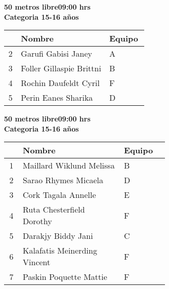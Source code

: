 \begin{minipage}{0.95\linewidth}\vspace{0.5cm} 
\begin{flushleft}
\textbf{
\hspace{-0.15cm}50 metros libre\hspace{1.5cm}09:00 hrs \\Categoria 15-16 años}\vspace{-0.2cm} 
\end{flushleft}
\begin{tabular}{cp{0.63\linewidth}l}
\hline
& \textbf{Nombre} & \textbf{Equipo} \\ \hline
2 & Garufi Gabisi Janey & A \\ 
3 & Foller Gillaspie Brittni & B \\ 
4 & Rochin Daufeldt Cyril & F \\ 
5 & Perin Eanes Sharika & D \\ 
\end{tabular}
\end{minipage}
\begin{minipage}{0.95\linewidth}\vspace{0.5cm} 
\begin{flushleft}
\textbf{
\hspace{-0.15cm}50 metros libre\hspace{1.5cm}09:00 hrs \\Categoria 15-16 años}\vspace{-0.2cm} 
\end{flushleft}
\begin{tabular}{cp{0.63\linewidth}l}
\hline
& \textbf{Nombre} & \textbf{Equipo} \\ \hline
1 & Maillard Wiklund Melissa & B \\ 
2 & Sarao Rhymes Micaela & D \\ 
3 & Cork Tagala Annelle & E \\ 
4 & Ruta Chesterfield Dorothy & F \\ 
5 & Darakjy Biddy Jani & C \\ 
6 & Kalafatis Meinerding Vincent & F \\ 
7 & Paskin Poquette Mattie & F \\ 
\end{tabular}
\end{minipage}
